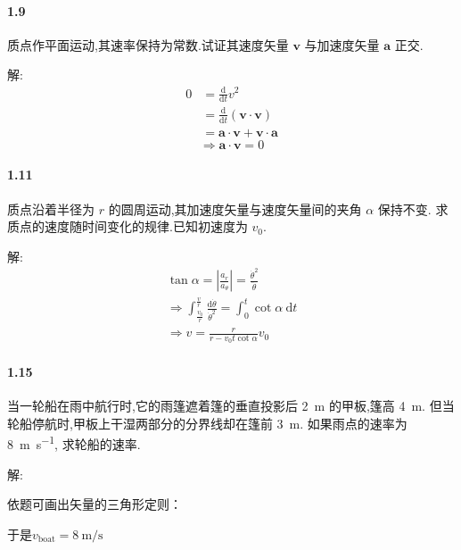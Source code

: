 \documentclass[UTF8,a4paper]{ctexart}
\begin{document}
\paragraph{1.9} 质点作平面运动,其速率保持为常数.试证其速度矢量 $ \boldsymbol{v} $ 与加速度矢量 $ \boldsymbol{a} $ 正交.
\par 解:
\begin{equation*}
	\begin{aligned}
	0&=\frac{\mathrm{d}}{\mathrm{d}t} v^2 \\ 
	&= \frac{\mathrm{d}}{\mathrm{d}t}\left(  \boldsymbol{v} \cdot \boldsymbol{v} \right)  \\
	&= \boldsymbol{a} \cdot \boldsymbol{v} + \boldsymbol{v} \cdot \boldsymbol{a}
	\end{aligned}
	\end{equation*}
	\[\Rightarrow \boldsymbol{a} \cdot \boldsymbol{v} = 0\]
	
\paragraph{1.11} 质点沿着半径为 $ r $ 的圆周运动,其加速度矢量与速度矢量间的夹角 $ \alpha $ 保持不变. 求质点的速度随时间变化的规律.已知初速度为 $ v_0 $.
\par 解:
\begin{gather*}
	\tan \alpha = \left| \frac{a_r}{a_\theta }\right|=\frac{\dot{\theta}^2}{\ddot{\theta}} \\
	\Rightarrow \int _{\frac{v_0}{r}}^{\frac{v}{r}} \frac{\mathrm{d} \dot{\theta}}{\dot{\theta}^2} 
	= \int _{0}^{t} \cot \alpha \  \mathrm{d} t \\
	\Rightarrow v = \frac{r}{r - v_0 t \cot \alpha} v_0
\end{gather*}

\paragraph{1.15} 当一轮船在雨中航行时,它的雨篷遮着篷的垂直投影后 \SI{2}{\metre} 的甲板,篷高 \SI{4}{\meter}. 但当轮船停航时,甲板上干湿两部分的分界线却在篷前 \SI{3}{\metre}. 如果雨点的速率为 \SI{8}{\meter \per \second}, 求轮船的速率.
\par 解:

依题可画出矢量的三角形定则：\\
\begin{center}
\end{center}
于是$ v_\mathrm{boat} = \SI{8}{\metre \per \second}$
\end{document}
